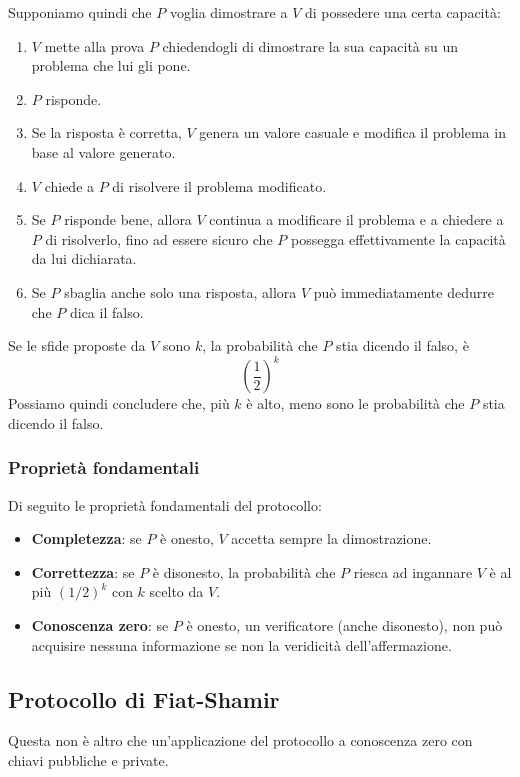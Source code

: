 Supponiamo quindi che $P$ voglia dimostrare a $V$ di possedere una certa capacit\`a:
\begin{enumerate}
	\item $V$ mette alla prova $P$ chiedendogli di dimostrare la sua capacit\`a su un problema che lui gli pone.
	\item $P$ risponde.
	\item Se la risposta \`e corretta, $V$ genera un valore casuale e modifica il problema in base al valore generato.
	\item $V$ chiede a $P$ di risolvere il problema modificato.
	\item Se $P$ risponde bene, allora $V$ continua a modificare il problema e a chiedere a $P$ di risolverlo, fino ad
	      essere sicuro che $P$ possegga effettivamente la capacit\`a da lui dichiarata.
	\item Se $P$ sbaglia anche solo una risposta, allora $V$ pu\`o immediatamente dedurre che $P$ dica il falso.
\end{enumerate}
Se le sfide proposte da $V$ sono $k$, la probabilit\`a che $P$ stia dicendo il falso, \`e
\[ \left( \frac{1}{2} \right)^k \]
Possiamo quindi concludere che, pi\`u $k$ \`e alto, meno sono le probabilit\`a che $P$ stia dicendo il falso.

\subsubsection{Propriet\`a fondamentali}
Di seguito le propriet\`a fondamentali del protocollo:
\begin{itemize}
	\item \textbf{Completezza}: se $P$ \`e onesto, $V$ accetta sempre la dimostrazione.
	\item \textbf{Correttezza}: se $P$ \`e disonesto, la probabilit\`a che $P$ riesca ad ingannare $V$ \`e al pi\`u
	      $(1/2)^k$ con $k$ scelto da $V$.
	\item \textbf{Conoscenza zero}: se $P$ \`e onesto, un verificatore (anche disonesto), non pu\`o acquisire nessuna
	      informazione se non la veridicit\`a dell'affermazione.
\end{itemize}

\subsection{Protocollo di Fiat-Shamir}
Questa non \`e altro che un'applicazione del protocollo a conoscenza zero con chiavi pubbliche e private.

